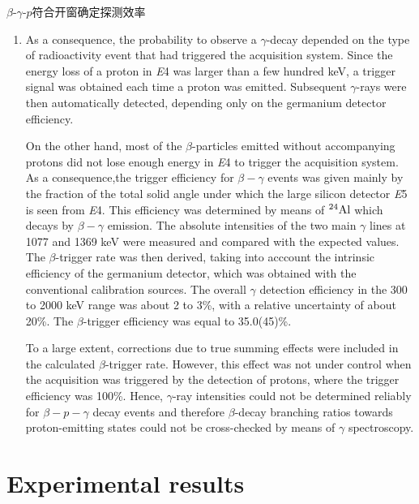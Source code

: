 \documentclass[a4paper]{article}
\begin{document}
$\beta$-$\gamma$-$p$符合开窗确定探测效率
\begin{enumerate}
    \item As a consequence, the probability to observe a $\gamma$-decay depended on the type of radioactivity event that had triggered the acquisition system. Since the energy loss of a proton in \textit{E}4 was larger than a few hundred keV, a trigger signal was obtained each time a proton was emitted. Subsequent $\gamma$-rays were then automatically detected, depending only on the germanium detector efficiency.

    On the other hand, most of the $\beta$-particles emitted without accompanying protons did not lose enough energy in \textit{E}4 to trigger the acquisition system. As a consequence,the trigger efficiency for $\beta-\gamma $ events was given mainly by the fraction of the total solid angle under which the large silicon detector \textit{E}5 is seen from \textit{E}4. This efficiency was determined by means of $^{24}\textnormal{Al}$ which decays by $\beta-\gamma $ emission. The absolute intensities of the two main $\gamma$ lines at 1077 and 1369 keV were measured and compared with the expected values. The $\beta$-trigger rate was then derived, taking into acccount the intrinsic efficiency of the germanium detector, which was obtained with the conventional calibration sources. The overall $\gamma$ detection efficiency in the 300 to 2000 keV range was about 2 to 3\%, with a relative uncertainty of about 20\%. The $\beta$-trigger efficiency was equal to 35.0(45)\%.

    To a large extent, corrections due to true summing effects were included in the calculated $\beta$-trigger rate. However, this effect was not under control when the acquisition was triggered by the detection of protons, where the trigger efficiency was 100\%. Hence, $\gamma$-ray intensities could not be determined reliably for $\beta-p-\gamma $ decay events and therefore $\beta$-decay branching ratios towards proton-emitting states could not be cross-checked by means of $\gamma$ spectroscopy.
\end{enumerate}

\section{Experimental results}
\end{document}
